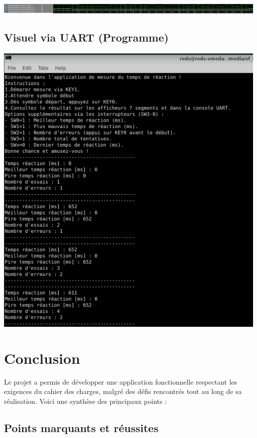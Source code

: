\documentclass[a4paper,12pt]{article}
\begin{document}
\includegraphics[width=\textwidth]{test_max10.png}

\break

\subsection{Visuel via UART (Programme)}

\includegraphics[width=\textwidth]{tests_via_uart.png}

\break

\section{Conclusion}
Le projet a permis de développer une application fonctionnelle respectant les exigences du cahier des charges, malgré des défis rencontrés tout au long de sa réalisation. Voici une synthèse des principaux points :

\subsection{Points marquants et réussites}
\end{document}
